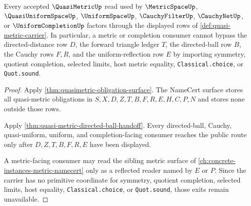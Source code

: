 \begin{theorem}
\label{thm:quasi-metric-nonescape}
Every accepted $\QuasiMetricUp$ read used by $\MetricSpaceUp$, $\QuasiUniformSpaceUp$, $\UniformSpaceUp$, $\CauchyFilterUp$, $\CauchyNetUp$, or $\UniformCompletionUp$ factors through the displayed rows of \autoref{def:quasi-metric-carrier}. In particular, a metric or completion consumer cannot bypass the directed-distance row $D$, the forward triangle ledger $T$, the directed-ball row $B$, the Cauchy rows $F,R$, and the uniform-reflection row $E$ by importing symmetry, quotient completion, selected limits, host metric equality, \texttt{Classical.choice}, or \texttt{Quot.sound}.
\end{theorem}
\begin{proof}
Apply \autoref{thm:quasimetric-obligation-surface}. The NameCert surface stores all quasi-metric obligations in $S,X,D,Z,T,B,F,R,E,H,C,P,N$ and stores none outside those rows.

Apply \autoref{thm:quasi-metric-directed-ball-handoff}. Every directed-ball, Cauchy, quasi-uniform, uniform, and completion-facing consumer reaches the public route only after $D,Z,T,B,F,R,E$ have been displayed.

A metric-facing consumer may read the sibling metric surface of \autoref{ch:concrete-instances-metric-namecert} only as a reflected reader named by $E$ or $P$. Since the carrier has no primitive coordinate for symmetry, quotient completion, selected limits, host equality, \texttt{Classical.choice}, or \texttt{Quot.sound}, those exits remain unavailable.
\end{proof}

